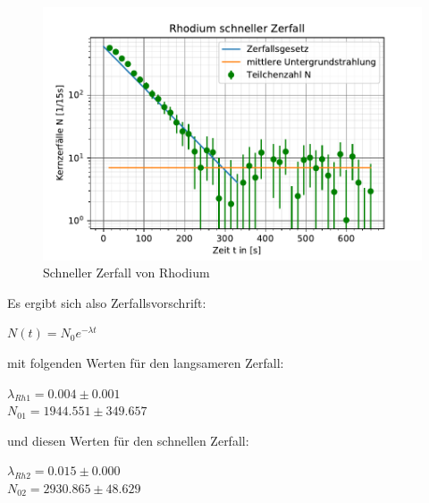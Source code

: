   \begin{figure}
    \centering
    \includegraphics{rhodium1.pdf}
    \caption{Schneller Zerfall von Rhodium}
    \label{fig:magnet}
  \end{figure}
  Es ergibt sich also Zerfallsvorschrift:
  \begin{center}
      $N(t)=N_0 e^{-\lambda t}$
  \end{center}
mit folgenden Werten für den langsameren Zerfall:
\begin{center}
    $\lambda_{Rh1} =0.004\pm 0.001$\\
    $N_{01}=1944.551 \pm 349.657$
\end{center}
und diesen Werten für den schnellen Zerfall:
\begin{center}
    $\lambda_{Rh2} =0.015\pm 0.000$\\
    $N_{02}=2930.865 \pm 48.629$  
\end{center}
